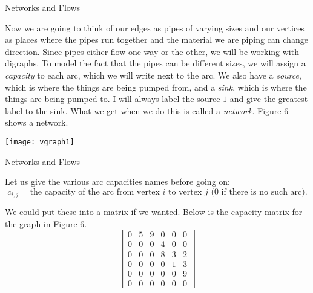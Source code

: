 \begin{frame}[fragile]{Networks and Flows}
   
Now we are going to think of our edges as pipes of varying sizes and our vertices as places where the pipes run together and the material we are piping can change direction.  Since pipes either flow one way or the other, we will be working with digraphs.  To model the fact that the pipes can be different sizes, we will assign a {\it capacity\/} to each arc, which we will write next to the arc.  We also have a {\it source\/}, which is where the things are being pumped from, and a {\it sink\/}, which is where the things are being pumped to.  I will always label the source $1$ and give the greatest label to the sink.  What we get when we do this is called a {\it network\/}.  Figure 6 shows a network.

\begin{center}
\texttt{[image: vgraph1]}
\end{center}

%
%
%

\end{frame}
\begin{frame}[fragile]{Networks and Flows}


Let us give the various arc capacities names before going on:
$$
c_{i,j}
=
\mbox{the capacity of the arc from vertex $i$ to vertex $j$ ($0$ if there is no such arc).}
$$

We could put these into a matrix if we wanted.  Below is the capacity matrix for the graph in Figure 6.
$$
\left[\begin{array}{rrrrrr}
0&5&9&0&0&0\\
0&0&0&4&0&0\\
0&0&0&8&3&2\\
0&0&0&0&1&3\\
0&0&0&0&0&9\\
0&0&0&0&0&0
\end{array}
\right]
$$

\end{frame}
